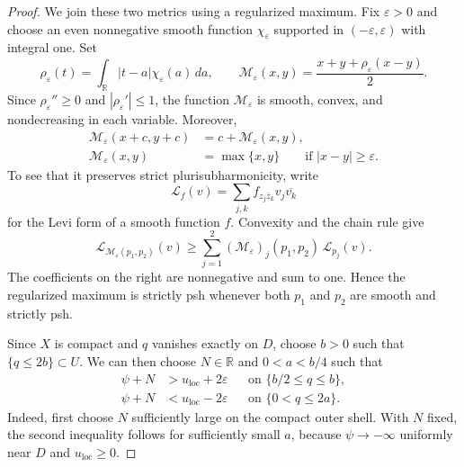 \documentclass[11pt]{amsart}
\theoremstyle{definition}
\theoremstyle{remark}
\numberwithin{equation}{section}
\newcommand{\R}{\mathbb R}
\newcommand{\Levi}{\mathcal L}
\begin{document}
\begin{proof}
We join these two metrics using a regularized maximum.
Fix $\varepsilon>0$ and choose an even nonnegative smooth
function $\chi_\varepsilon$ supported in
$(-\varepsilon,\varepsilon)$ with integral one. Set
\[
 \rho_\varepsilon(t)
 =\int_\R |t-a|\chi_\varepsilon(a)\,da,\qquad
 \mathcal M_\varepsilon(x,y)
 =\frac{x+y+\rho_\varepsilon(x-y)}2.
\]
Since $\rho_\varepsilon''\ge0$ and
$|\rho_\varepsilon'|\le1$, the function
$\mathcal M_\varepsilon$ is smooth, convex, and
nondecreasing in each variable. Moreover,
\[
 \begin{aligned}
 \mathcal M_\varepsilon(x+c,y+c)
   &=c+\mathcal M_\varepsilon(x,y),\\
 \mathcal M_\varepsilon(x,y)
   &=\max\{x,y\}
   \qquad\text{if }|x-y|\ge\varepsilon.
 \end{aligned}
\]
To see that it preserves strict plurisubharmonicity, write
\[
 \Levi_f(v)=\sum_{j,k}
 f_{z_j\bar z_k}v_j\overline{v_k}
\]
for the Levi form of a smooth function $f$.
Convexity and the chain rule give
\[
 \Levi_{\mathcal M_\varepsilon(p_1,p_2)}(v)
 \ge
 \sum_{j=1}^2
 (\mathcal M_\varepsilon)_j(p_1,p_2)\,
 \Levi_{p_j}(v).
\]
The coefficients on the right are nonnegative and sum
to one. Hence the regularized maximum is strictly psh
whenever both $p_1$ and $p_2$ are smooth and strictly psh.

Since $X$ is compact and $q$ vanishes exactly on $D$,
choose $b>0$ such that $\{q\le2b\}\subset U$.
We can then choose $N\in\R$ and $0<a<b/4$ such that
\begin{equation}\label{eq:metric-collars}
 \begin{aligned}
 \psi+N&>u_{\mathrm{loc}}+2\varepsilon
   &&\text{on }\{b/2\le q\le b\},\\
 \psi+N&<u_{\mathrm{loc}}-2\varepsilon
   &&\text{on }\{0<q\le2a\}.
 \end{aligned}
\end{equation}
Indeed, first choose $N$ sufficiently large on the compact
outer shell. With $N$ fixed, the second inequality follows
for sufficiently small $a$, because $\psi\to-\infty$
uniformly near $D$ and $u_{\mathrm{loc}}\ge0$.


\end{proof}
\end{document}
